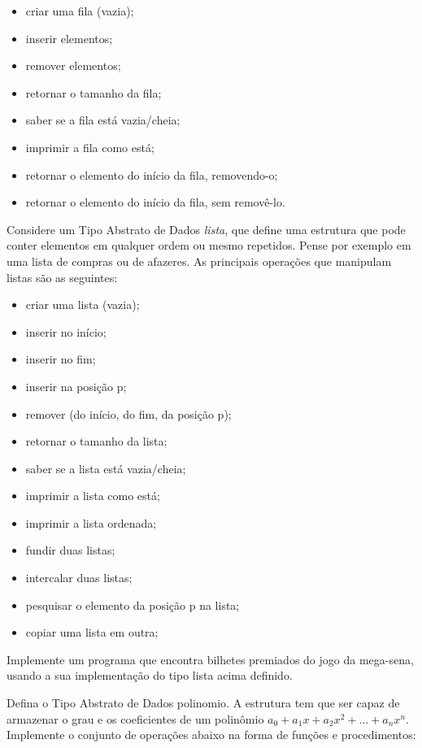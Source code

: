 \begin{itemize}
   \item criar uma fila (vazia);
   \item inserir elementos;
   \item remover elementos;
   \item retornar o tamanho da fila;
   \item saber se a fila está vazia/cheia;
   \item imprimir a fila como está;
   \item retornar o elemento do início da fila, removendo-o;
   \item retornar o elemento do início da fila, sem removê-lo.
\end{itemize}

\item Considere um Tipo Abstrato de Dados \emph{lista}, que define
uma estrutura que pode conter elementos em qualquer ordem ou mesmo
repetidos. Pense por exemplo em uma lista de compras ou de afazeres.
As principais operações que manipulam listas são as seguintes:
\begin{itemize}
   \item criar uma lista (vazia);
   \item inserir no início;
   \item inserir no fim;
   \item inserir na posição p;
   \item remover (do início, do fim, da posição p);
   \item retornar o tamanho da lista;
   \item saber se a lista está vazia/cheia;
   \item imprimir a lista como está;
   \item imprimir a lista ordenada;
   \item fundir duas listas;
   \item intercalar duas listas;
   \item pesquisar o elemento da posição p na lista;
   \item copiar uma lista em outra;
\end{itemize}

\item Implemente um programa que encontra bilhetes premiados do jogo da mega-sena, usando a sua implementação do tipo lista acima definido.

\item Defina o Tipo Abstrato de Dados \textsf{polinomio}. A estrutura tem
que ser capaz de armazenar o grau e os coeficientes de um polinômio
$a_0 + a_1x + a_2x^2 + \ldots + a_nx^n$. Implemente o conjunto de
operações abaixo na forma de funções e procedimentos:


